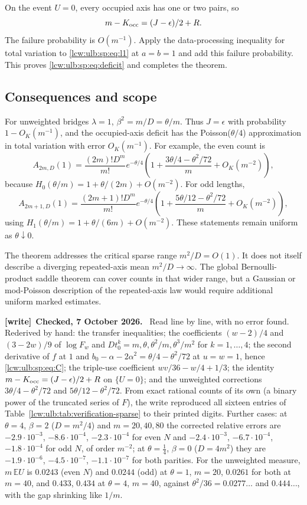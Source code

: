 \documentclass[11pt,letterpaper]{article}
\theoremstyle{remark}\newtheorem{remark}[theorem]{Remark}
\newcommand{\E}{\mathbb E}\newcommand{\Pp}{\mathbb P}
\newenvironment{writenote}[1][]{\par\smallskip\begingroup\small
 \noindent\textbf{[write]}\if\relax\detokenize{#1}\relax\else~\textbf{#1.}\fi\ }%
 {\par\endgroup\smallskip}
\begin{document}
On the event $U=0$, every occupied axis has one or two pairs, so
\[
 m-K_{\rm occ}=(J-\epsilon)/2+R.
\]
The failure probability is $O(m^{-1})$. Apply the data-processing
inequality for total variation to \eqref{lcw:ulb:sp:eq:l1} at $a=b=1$
and add this failure probability. This proves
\eqref{lcw:ulb:sp:eq:deficit} and completes the theorem.

\subsection{Consequences and scope}

For unweighted bridges $\lambda=1$, $\beta^2=m/D=\theta/m$.
Thus $J=\epsilon$ with probability $1-O_K(m^{-1})$, and the
occupied-axis deficit has the Poisson($\theta/4$) approximation
in total variation with error $O_K(m^{-1})$.
For example, the even count is
\[
 A_{2m,D}(1)=\frac{(2m)!D^m}{m!}e^{-\theta/4}
 \left(1+\frac{3\theta/4-\theta^2/72}{m}
 +O_K(m^{-2})\right),
\]
because $H_0(\theta/m)=1+\theta/(2m)+O(m^{-2})$.
For odd lengths,
\[
 A_{2m+1,D}(1)=\frac{(2m+1)!D^m}{m!}e^{-\theta/4}
 \left(1+\frac{5\theta/12-\theta^2/72}{m}
 +O_K(m^{-2})\right),
\]
using $H_1(\theta/m)=1+\theta/(6m)+O(m^{-2})$.
These statements remain uniform as $\theta\downarrow0$.

The theorem addresses the critical sparse range $m^2/D=O(1)$.
It does not itself describe a diverging repeated-axis mean
$m^2/D\to\infty$. The global Bernoulli-product saddle theorem
can cover counts in that wider range, but a Gaussian or
mod-Poisson description of the repeated-axis law would require
additional uniform marked estimates.

\begin{writenote}[Checked, 7 October 2026]
Read line by line, with no error found. Rederived by hand: the transfer
inequalities; the coefficients $(w-2)/4$ and $(3-2w)/9$ of $\log F_w$ and
$Dt_0^k=m,\theta,\theta^2/m,\theta^3/m^2$ for $k=1,\dots,4$; the second
derivative of $f$ at $1$ and $b_0-\alpha-2\alpha^2=\theta/4-\theta^2/72$ at
$u=w=1$, hence \eqref{lcw:ulb:sp:eq:C}; the triple-use coefficient
$wv/36-w/4+1/3$; the identity $m-K_{\rm occ}=(J-\epsilon)/2+R$ on $\{U=0\}$;
and the unweighted corrections $3\theta/4-\theta^2/72$ and
$5\theta/12-\theta^2/72$. From exact rational counts of its own (a binary
power of the truncated series of $F$), the write reproduced all sixteen
entries of Table~\ref{lcw:ulb:tab:verification-sparse} to their printed
digits. Further cases: at $\theta=4$, $\beta=2$ ($D=m^2/4$) and
$m=20,40,80$ the corrected relative errors are $-2.9\cdot10^{-3}$,
$-8.6\cdot10^{-4}$, $-2.3\cdot10^{-4}$ for even $N$ and $-2.4\cdot10^{-3}$,
$-6.7\cdot10^{-4}$, $-1.8\cdot10^{-4}$ for odd $N$, of order $m^{-2}$; at
$\theta=\tfrac14$, $\beta=0$ ($D=4m^2$) they are $-1.9\cdot10^{-6}$,
$-4.5\cdot10^{-7}$, $-1.1\cdot10^{-7}$ for both parities. For the unweighted
measure, $m\,\E U$ is $0.0243$ (even $N$) and $0.0244$ (odd) at $\theta=1$,
$m=20$, $0.0261$ for both at $m=40$, and $0.433$, $0.434$ at $\theta=4$,
$m=40$, against
$\theta^2/36=0.0277\ldots$ and $0.444\ldots$, with the gap shrinking like $1/m$.
\end{writenote}
\end{document}
